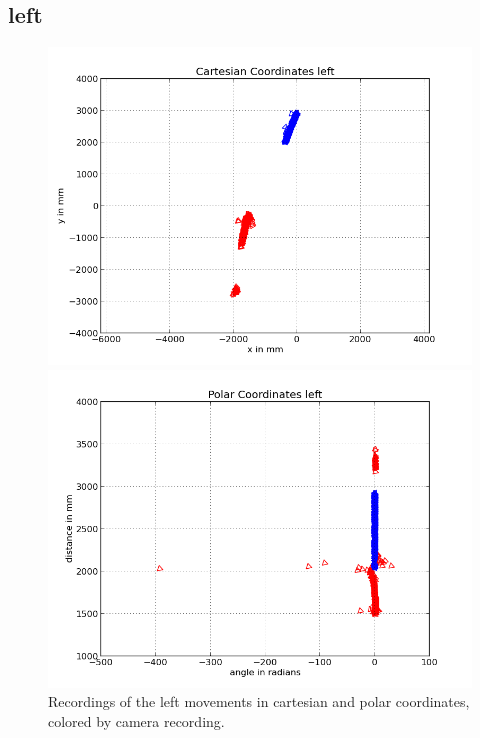 \documentclass{scrartcl}
\begin{document}
\subsection{left}
\begin{figure}[H]
\centering
\begin{minipage}{.5\textwidth}
  \centering
  \includegraphics[width=.8\linewidth]{img/left_n.png}
\end{minipage}%
\begin{minipage}{.5\textwidth}
  \centering
  \includegraphics[width=.8\linewidth]{img/left_pc_n.png}
\end{minipage}
\caption{Recordings of the left movements in cartesian and polar coordinates, colored by camera recording.}
\label{fig:left}
\end{figure}
\end{document}
